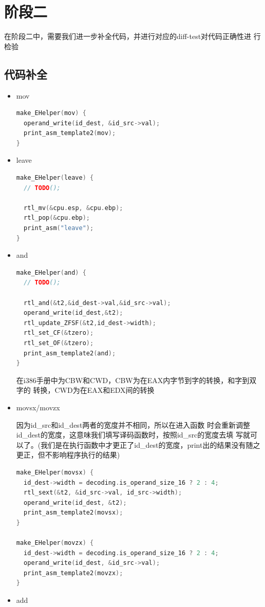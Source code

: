 \documentclass[UTF8,a4paper,10pt]{ctexart}
\begin{document}
\section{阶段二}
在阶段二中，需要我们进一步补全代码，并进行对应的diff-test对代码正确性进
行检验
\subsection{代码补全}
\begin{itemize}
  \item mov
  \begin{lstlisting}[language = C++]
make_EHelper(mov) {
  operand_write(id_dest, &id_src->val);
  print_asm_template2(mov);
}
  \end{lstlisting}
  \item leave
  \begin{lstlisting}[language = C]
make_EHelper(leave) {
  // TODO();

  rtl_mv(&cpu.esp, &cpu.ebp);
  rtl_pop(&cpu.ebp);
  print_asm("leave");
}
\end{lstlisting}
  \item and
  \begin{lstlisting}[language = C]
make_EHelper(and) {
  // TODO();
  
  rtl_and(&t2,&id_dest->val,&id_src->val);
  operand_write(id_dest,&t2);
  rtl_update_ZFSF(&t2,id_dest->width);
  rtl_set_CF(&tzero);
  rtl_set_OF(&tzero);
  print_asm_template2(and);
}
\end{lstlisting}
  
  在i386手册中为CBW和CWD，CBW为在EAX内字节到字的转换，和字到双字的 转换，CWD为在EAX和EDX间的转换

  \item movsx/movzx
  
  因为id\_src和id\_dest两者的宽度并不相同，所以在进入函数 时会重新调整id\_dest的宽度，这意味我们填写译码函数时，按照id\_src的宽度去填 写就可以了。(我们是在执行函数中才更正了id\_dest的宽度，print出的结果没有随之更正，但不影响程序执行的结果)
  \begin{lstlisting}[language = C]
make_EHelper(movsx) {
  id_dest->width = decoding.is_operand_size_16 ? 2 : 4;
  rtl_sext(&t2, &id_src->val, id_src->width);
  operand_write(id_dest, &t2);
  print_asm_template2(movsx);
}
    
make_EHelper(movzx) {
  id_dest->width = decoding.is_operand_size_16 ? 2 : 4;
  operand_write(id_dest, &id_src->val);
  print_asm_template2(movzx);
}
\end{lstlisting}
\item add


\end{itemize}
\end{document}
